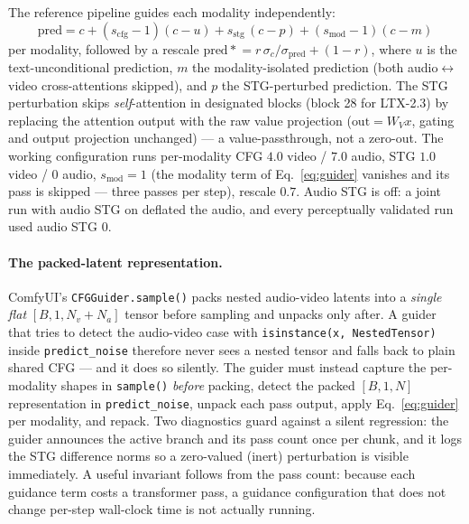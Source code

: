 \documentclass[12pt]{article}
\begin{document}
The reference pipeline guides each modality independently:
\begin{equation}
\text{pred} = c + (s_{\text{cfg}}-1)(c-u)
             + s_{\text{stg}}\,(c-p)
             + (s_{\text{mod}}-1)(c-m)
\label{eq:guider}
\end{equation}
per modality, followed by a rescale
$\text{pred} \mathrel{*}= r\,\sigma_c/\sigma_{\text{pred}} + (1-r)$,
where $u$ is the text-unconditional prediction, $m$ the modality-isolated
prediction (both audio$\leftrightarrow$video cross-attentions skipped), and
$p$ the STG-perturbed prediction.  The STG perturbation skips
\emph{self}-attention in designated blocks (block 28 for LTX-2.3) by
replacing the attention output with the raw value projection
($\text{out}=W_V x$, gating and output projection unchanged) --- a
value-passthrough, not a zero-out.  The working configuration runs
per-modality CFG $4.0$ video / $7.0$ audio, STG $1.0$ video / $0$ audio,
$s_{\text{mod}}=1$ (the modality term of Eq.~\eqref{eq:guider} vanishes and
its pass is skipped --- three passes per step), rescale $0.7$.  Audio STG is
off: a joint run with audio STG on deflated the audio, and every
perceptually validated run used audio STG $0$.

\paragraph{The packed-latent representation.}  ComfyUI's
\texttt{CFGGuider.sample()} packs nested audio-video latents into a
\emph{single flat} $[B,1,N_v{+}N_a]$ tensor before sampling and unpacks only
after.  A guider that tries to detect the audio-video case with
\texttt{isinstance(x, NestedTensor)} inside \texttt{predict\_noise} therefore
never sees a nested tensor and falls back to plain shared CFG --- and it does
so silently.  The guider must instead capture the per-modality shapes in
\texttt{sample()} \emph{before} packing, detect the packed $[B,1,N]$
representation in \texttt{predict\_noise}, unpack each pass output, apply
Eq.~\eqref{eq:guider} per modality, and repack.  Two diagnostics guard
against a silent regression: the guider announces the active branch and its
pass count once per chunk, and it logs the STG difference norms so a
zero-valued (inert) perturbation is visible immediately.  A useful invariant
follows from the pass count: because each guidance term costs a transformer
pass, a guidance configuration that does not change per-step wall-clock time
is not actually running.

\end{document}
